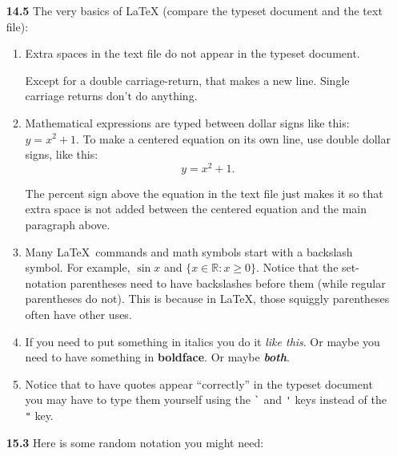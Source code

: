 \documentclass[12pt]{article}
\begin{document}
\begin{enumerate}

\item[{\bf \large 14.5}]
The very basics of \LaTeX\/ (compare the typeset document and the text file):

\begin{enumerate}
\item
Extra spaces    in           the text              file do     not    appear   in    the     typeset     document.

Except for a double carriage-return, that makes a new line.
Single
carriage
returns
don't
do
anything.


\item
Mathematical expressions are typed between dollar signs like this:
$y=x^2+1$.  To make a centered equation on its own line, use
double dollar signs, like this:
%
$$y=x^2+1.$$

The percent sign above the equation in the text file just makes it
so that extra space is not added between the centered equation and
the main paragraph above.


\item
Many \LaTeX\ commands and math symbols start with a backslash
symbol.  For example, $\sin x$ and $\{x \in \mathbb{R} : x \geq
0\}$.  Notice that the set-notation parentheses need to have
backslashes before them (while regular parentheses do not).  This
is because in \LaTeX, those squiggly parentheses often have other
uses.


\item
If you need to put something in italics you do it {\em like this}.
Or maybe you need to have something in {\bf boldface}.  Or maybe
{\bf \em both}.

\item
Notice that to have quotes appear ``correctly'' in the typeset
document you may have to type them yourself using the \verb|`| and
\verb|'| keys instead of the \verb|"| key.



\end{enumerate}

\item[{\bf \large 15.3}]
Here is some random notation you might need:
\vspace{.5\baselineskip}


\end{enumerate}
\end{document}
